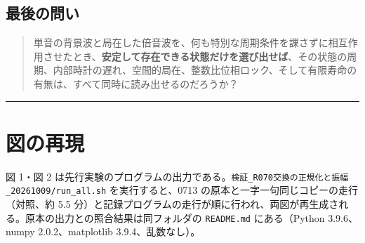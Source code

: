 \documentclass[
  a4paper,
]{ltjsarticle}
\begin{document}
\subsection{最後の問い}\label{ux6700ux5f8cux306eux554fux3044}

\begin{quote}
単音の背景波と局在した倍音波を、何も特別な周期条件を課さずに相互作用させたとき、\textbf{安定して存在できる状態だけを選び出せば}、その状態の周期、内部時計の遅れ、空間的局在、整数比位相ロック、そして有限寿命の有無は、すべて同時に読み出せるのだろうか？
\end{quote}

\begin{center}\rule{0.5\linewidth}{0.5pt}\end{center}

\section{図の再現}\label{ux56f3ux306eux518dux73fe}

図 1・図 2
は先行実験のプログラムの出力である。\texttt{検証\_\allowbreak{}R070交換の正規化と振幅\_\allowbreak{}20261009/\allowbreak{}run\_\allowbreak{}all.sh}
を実行すると、0713 の原本と一字一句同じコピーの走行（対照、約 5.5
分）と記録プログラムの走行が順に行われ、両図が再生成される。原本の出力との照合結果は同フォルダの
\texttt{README.md} にある（Python 3.9.6、numpy 2.0.2、matplotlib
3.9.4、乱数なし）。
\end{document}
